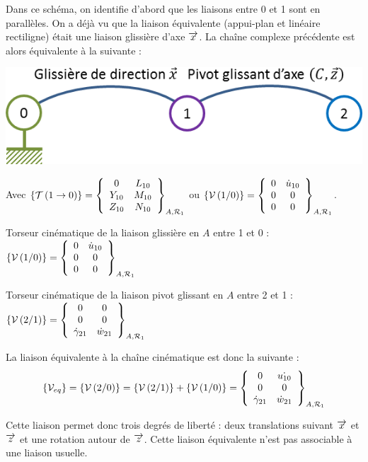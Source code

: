 \documentclass[10pt]{article}
\begin{document}
Dans ce schéma, on identifie d'abord que les liaisons entre 0 et 1 sont en parallèles.
On a déjà vu que la liaison équivalente (appui-plan et linéaire rectiligne) était une liaison glissière d'axe $\vect{x}$. La chaîne complexe précédente est alors équivalente à la suivante : 

\noindent\begin{minipage}[c]{.45\linewidth}
\begin{center}
\includegraphics[width=.95\textwidth]{images/cc_2}
\end{center}
\end{minipage}\hfill
\begin{minipage}[c]{.5\linewidth}
Avec $\torseurstat{T}{1}{0}=\torseurcol{0}{Y_{10}}{Z_{10}}{L_{10}}{M_{10}}{N_{10}}{A,\mathcal{R}_1}$ ou $\torseurcin{V}{1}{0}=\torseurcol{0}{0}{0}{\dot{u}_{10}}{0}{0}{A,\mathcal{R}_1}$.
\end{minipage}

\noindent
\colorbox{grisf}{}

Torseur cinématique de la liaison glissière en $A$ entre 1 et 0 : 
$\torseurcin{V}{1}{0}=\torseurcol{0}{0}{0}{\dot{u}_{10}}{0}{0}{A,\mathcal{R}_1}$

Torseur cinématique de la liaison pivot glissant en $A$ entre 2 et 1 :
$\torseurcin{V}{2}{1}=\torseurcol{0}{0}{\dot{\gamma}_{21}}{0}{0}{\dot{w}_{21}}{A,\mathcal{R}_1}
$

La liaison équivalente à la chaîne cinématique est donc la suivante : 
$$\{\mathcal{V}_{eq}\}=\torseurcin{V}{2}{0}=\torseurcin{V}{2}{1}+\torseurcin{V}{1}{0}
=\torseurcol{0}{0}{\dot{\gamma}_{21}}{\dot{u_{10}}}{0}{\dot{w}_{21}}{A,\mathcal{R}_1}
$$

Cette liaison permet donc trois degrés de liberté : deux translations suivant $\vect{x}$ et $\vect{z}$ et une rotation autour de $\vect{z}$. Cette liaison équivalente n'est pas associable à une liaison usuelle. 

\noindent\colorbox{grisf}{}
\end{document}
